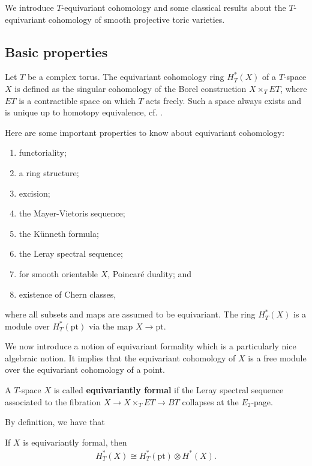 We introduce $T$-equivariant cohomology and some classical results about the
$T$-equivariant cohomology of smooth projective toric varieties.

\subsection{Basic properties}
Let $T$ be a complex torus. The equivariant cohomology ring $H_T^*(X)$ of a $T$-space $X$ is
defined as the singular cohomology of the Borel construction $X\times_T ET$,
where $ET$ is a contractible space on which $T$ acts freely. Such a space
always exists and is unique up to homotopy equivalence, cf. \cite{hatcher}.

Here are some important properties to know about equivariant cohomology:

\begin{enumerate}
	\item functoriality;
	\item a ring structure;
	\item excision;
	\item the Mayer-Vietoris sequence;
	\item the Künneth formula;
	\item the Leray spectral sequence;
	\item for smooth orientable $X$, Poincaré duality; and
	\item existence of Chern classes,
\end{enumerate}
where all subsets and maps are assumed to be equivariant. The
ring $H^*_T(X)$ is a module over $H^*_T(\text{pt})$ via the map $X \to \text{pt}$.

We now introduce a notion of equivariant formality which is a particularly
nice algebraic notion. It implies that the equivariant cohomology of $X$ is a free module over the equivariant cohomology of a point.

\begin{definition}
	A $T$-space $X$ is called \textbf{equivariantly formal} if the Leray spectral sequence
	associated to the fibration $X \to X \times_T ET \to BT$ collapses at the $E_2$-page.
\end{definition}

By definition, we have that
\begin{proposition}
	If $X$ is equivariantly formal, then \begin{align*}
		H^*_T(X) \cong H^*_T(\text{pt}) \otimes H^*(X).
	\end{align*}
\end{proposition}

